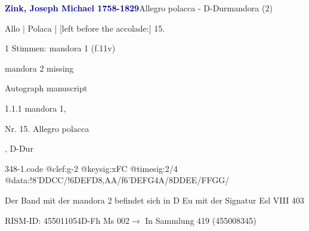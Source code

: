 \documentclass[twocolumn]{book}
\begin{document}
\par \vspace{7pt} \textcolor{darkblue}{\textbf{Zink, Joseph Michael  1758-1829}}\hfillplus{\textbf{[348]}}\newline Allegro polacca - D-Dur\newline mandora (2)
\par \begin{itshape}[f.11v, at left:] Allo | Polaca | [left before the accolade:] 15.\end{itshape} 
\par \textcolor{darkblue}{}  1 Stimmen: mandora 1  (f.11v)\newline \begin{small} mandora 2 missing\end{small} \newline Autograph manuscript
\par 1.1.1  mandora 1, \begin{itshape}Nr. 15. Allegro polacca\end{itshape}, D-Dur  
\begin{filecontents*}{348-1.code}
@clef:g-2
@keysig:xFC
@timesig:2/4
@data:!8'DDCC/!6DEFD{8,AA}/f6'DEFG4A/8DDEE/FFGG/
\end{filecontents*}
\newline
%
\par Der Band mit der mandora 2 befindet sich in D Eu mit der Signatur Esl VIII 403
\par RISM-ID: 455011054\newline D-Fh  Ms 002\newline $\rightarrow$ In Sammlung 419 (455008345)
      
\end{document}
